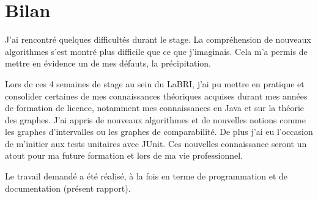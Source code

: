 \documentclass[12pt, a4paper]{report}
\begin{document}
	\section{Bilan}
		
	J'ai rencontré quelques difficultés durant le stage. La compréhension de nouveaux algorithmes s'est montré plus difficile que ce que j'imaginais. Cela m'a permis de mettre en évidence un de mes défauts, la précipitation.
	
	Lors de ces 4 semaines de stage au sein du LaBRI, j'ai pu mettre en pratique et consolider certaines de mes connaissances théoriques acquises durant mes années de formation de licence, notamment mes connaissances en Java et sur la théorie des graphes. J'ai appris de nouveaux algorithmes et de nouvelles notions comme les graphes d'intervalles ou les graphes de comparabilité. De plus j'ai eu l'occasion de m'initier aux tests unitaires avec JUnit. Ces nouvelles connaissance seront un atout pour ma future formation et lors de ma vie professionnel.
	
	Le travail demandé a été réalisé, à la fois en terme de programmation et de documentation (présent rapport).
	
	
\nocite{HCPV00, GHP95}


\end{document}
